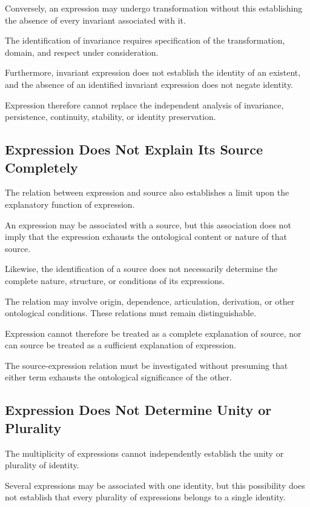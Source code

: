 Conversely, an expression may undergo transformation
without this establishing the absence of every
invariant associated with it.

The identification of invariance requires specification
of the transformation, domain, and respect under
consideration.

Furthermore, invariant expression does not establish
the identity of an existent, and the absence of an
identified invariant expression does not negate identity.

Expression therefore cannot replace the independent
analysis of invariance, persistence, continuity,
stability, or identity preservation.

\subsection{Expression Does Not Explain Its Source Completely}

The relation between expression and source also
establishes a limit upon the explanatory function
of expression.

An expression may be associated with a source,
but this association does not imply that the expression
exhausts the ontological content or nature of that source.

Likewise, the identification of a source does not
necessarily determine the complete nature, structure,
or conditions of its expressions.

The relation may involve origin, dependence,
articulation, derivation, or other ontological
conditions. These relations must remain distinguishable.

Expression cannot therefore be treated as a complete
explanation of source, nor can source be treated
as a sufficient explanation of expression.

The source-expression relation must be investigated
without presuming that either term exhausts the
ontological significance of the other.

\subsection{Expression Does Not Determine Unity or Plurality}

The multiplicity of expressions cannot independently
establish the unity or plurality of identity.

Several expressions may be associated with one
identity, but this possibility does not establish
that every plurality of expressions belongs to
a single identity.


